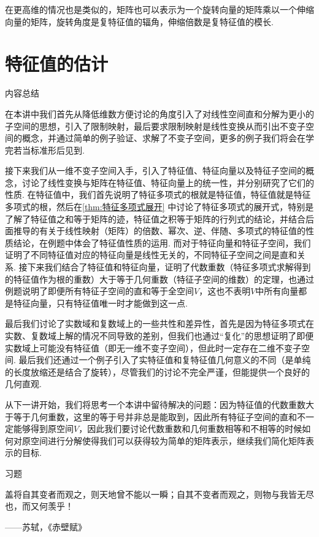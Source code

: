 在更高维的情况也是类似的，矩阵也可以表示为一个旋转向量的矩阵乘以一个伸缩向量的矩阵，旋转角度是复特征值的辐角，伸缩倍数是复特征值的模长.

\section{特征值的估计}

\vspace{2ex}
\centerline{\heiti \Large 内容总结}

在本讲中我们首先从降低维数方便讨论的角度引入了对线性空间直和分解为更小的子空间的思想，引入了限制映射，最后要求限制映射是线性变换从而引出不变子空间的概念，并通过简单的例子验证、求解了不变子空间，更多的例子我们将会在学完若当标准形后见到.

接下来我们从一维不变子空间入手，引入了特征值、特征向量以及特征子空间的概念，讨论了线性变换与矩阵在特征值、特征向量上的统一性，并分别研究了它们的性质. 在特征值中，我们首先说明了特征多项式的根就是特征值，特征值就是特征多项式的根，然后在\autoref{thm:特征多项式展开} 中讨论了特征多项式的展开式，特别是了解了特征值之和等于矩阵的迹，特征值之积等于矩阵的行列式的结论，并结合后面推导的有关于线性映射（矩阵）的倍数、幂次、逆、伴随、多项式的特征值的性质结论，在例题中体会了特征值性质的运用. 而对于特征向量和特征子空间，我们证明了不同特征值对应的特征向量是线性无关的，不同特征子空间之间是直和关系. 接下来我们结合了特征值和特征向量，证明了代数重数（特征多项式求解得到的特征值作为根的重数）大于等于几何重数（特征子空间的维数）的定理，也通过例题说明了即便所有特征子空间的直和等于全空间$V$，这也不表明$V$中所有向量都是特征向量，只有特征值唯一时才能做到这一点.

最后我们讨论了实数域和复数域上的一些共性和差异性，首先是因为特征多项式在实数、复数域上解的情况不同导致的差别，但我们也通过``复化''的思想证明了即便实数域上可能没有特征值（即无一维不变子空间），但此时一定存在二维不变子空间. 最后我们还通过一个例子引入了实特征值和复特征值几何意义的不同（是单纯的长度放缩还是结合了旋转），尽管我们的讨论不完全严谨，但能提供一个良好的几何直观.

从下一讲开始，我们将思考一个本讲中留待解决的问题：因为特征值的代数重数大于等于几何重数，这里的等于号并非总是能取到，因此所有特征子空间的直和不一定能够得到原空间$V$，因此我们要讨论代数重数和几何重数相等和不相等的时候如何对原空间进行分解使得我们可以获得较为简单的矩阵表示，继续我们简化矩阵表示的目标.

\vspace{2ex}
\centerline{\heiti \Large 习题}

\vspace{2ex}
{\kaishu 盖将自其变者而观之，则天地曾不能以一瞬；自其不变者而观之，则物与我皆无尽也，而又何羡乎！}
\begin{flushright}
    \kaishu
    ——苏轼，《赤壁赋》
\end{flushright}

